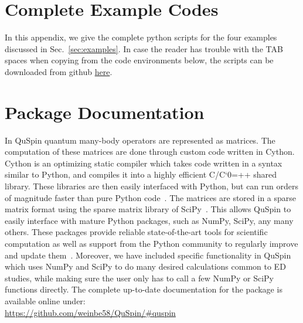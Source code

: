 \documentclass{SciPost}
\newcommand\0{\scalebox{-1}[1]{0}}
\let\svttfamily\ttfamily
\renewcommand\ttfamily{\svttfamily\catcode`0=\active }
\renewcommand\texttt{\bgroup\ttfamily\texttthelp}
\def\texttthelp#1{#1\egroup}
\begin{document}
\begin{appendix}
\newpage
\section{Complete Example Codes}
\label{app:scripts}

In this appendix, we give the complete python scripts for the four examples discussed in Sec.~\ref{sec:examples}. In case the reader has trouble with the TAB spaces when copying from the code environments below, the scripts can be downloaded from github \href{https://github.com/weinbe58/qspin_paper/tree/master/scripts}{here}.


\newpage

\newpage

\newpage



\section{Package Documentation}
\label{app:doc}
In QuSpin quantum many-body operators are represented as matrices. The computation of these matrices are done through custom code written in Cython. Cython is an optimizing static compiler which takes code written in a syntax similar to Python, and compiles it into a highly efficient C/C\texttt{++} shared library. These libraries are then easily interfaced with Python, but can run orders of magnitude faster than pure Python code~\cite{Cython}. The matrices are stored in a sparse matrix format using the sparse matrix library of SciPy~\cite{SciPy_package}. This allows QuSpin to easily interface with mature Python packages, such as NumPy, SciPy, any many others. These packages provide reliable state-of-the-art tools for scientific computation as well as support from the Python community to regularly improve and update them~\cite{NumPy,Python_computing_1,Python_computing_2,SciPy_package}. Moreover, we have included specific functionality in QuSpin which uses NumPy and SciPy to do many desired calculations common to ED studies, while making sure the user only has to call a few NumPy or SciPy functions directly. The complete up-to-date documentation for the package is available online under:\\

\href{https://github.com/weinbe58/QuSpin/#quspin}{https://github.com/weinbe58/QuSpin/\#quspin}\\

\end{appendix}
\end{document}
